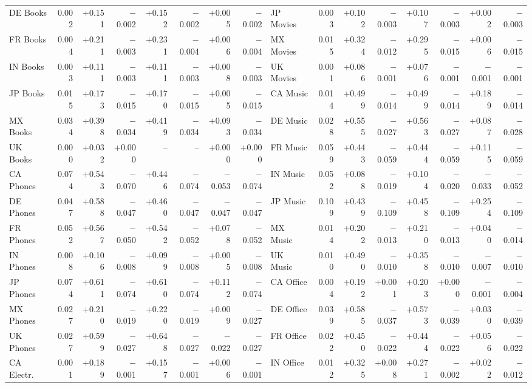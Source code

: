 \begin{table}[H]
\begin{tabular}{lrrrrrrr@{\hspace{10pt}}lrrrrrrr}
DE Books & 0.002 & +0.151 & $-$0.002 & +0.152 & $-$0.002 & +0.005 & $-$0.002 & JP Movies & 0.003 & +0.102 & $-$0.003 & +0.107 & $-$0.003 & +0.002 & $-$0.003 \\
FR Books & 0.004 & +0.211 & $-$0.003 & +0.231 & $-$0.004 & +0.006 & $-$0.004 & MX Movies & 0.015 & +0.324 & $-$0.012 & +0.295 & $-$0.015 & +0.006 & $-$0.015 \\
IN Books & 0.003 & +0.111 & $-$0.003 & +0.111 & $-$0.003 & +0.008 & $-$0.003 & UK Movies & 0.001 & +0.086 & $-$0.001 & +0.076 & $-$0.001 & $-$0.001 & $-$0.001 \\
JP Books & 0.015 & +0.173 & $-$0.015 & +0.170 & $-$0.015 & +0.005 & $-$0.015 & CA Music & 0.014 & +0.499 & $-$0.014 & +0.499 & $-$0.014 & +0.189 & $-$0.014 \\
MX Books & 0.034 & +0.398 & $-$0.034 & +0.419 & $-$0.034 & +0.093 & $-$0.034 & DE Music & 0.028 & +0.555 & $-$0.027 & +0.563 & $-$0.027 & +0.087 & $-$0.028 \\
UK Books & 0.000 & +0.032 & +0.000 & -- & -- & +0.000 & +0.000 & FR Music & 0.059 & +0.443 & $-$0.059 & +0.444 & $-$0.059 & +0.115 & $-$0.059 \\
CA Phones & 0.074 & +0.543 & $-$0.070 & +0.446 & $-$0.074 & $-$0.053 & $-$0.074 & IN Music & 0.052 & +0.088 & $-$0.019 & +0.104 & $-$0.020 & $-$0.033 & $-$0.052 \\
DE Phones & 0.047 & +0.588 & $-$0.047 & +0.460 & $-$0.047 & $-$0.047 & $-$0.047 & JP Music & 0.109 & +0.439 & $-$0.109 & +0.458 & $-$0.109 & +0.254 & $-$0.109 \\
FR Phones & 0.052 & +0.567 & $-$0.050 & +0.542 & $-$0.052 & +0.078 & $-$0.052 & MX Music & 0.014 & +0.202 & $-$0.013 & +0.210 & $-$0.013 & +0.040 & $-$0.014 \\
IN Phones & 0.008 & +0.106 & $-$0.008 & +0.099 & $-$0.008 & +0.005 & $-$0.008 & UK Music & 0.010 & +0.490 & $-$0.010 & +0.358 & $-$0.010 & $-$0.007 & $-$0.010 \\
JP Phones & 0.074 & +0.611 & $-$0.074 & +0.610 & $-$0.074 & +0.112 & $-$0.074 & CA Office & 0.004 & +0.192 & +0.001 & +0.203 & +0.000 & $-$0.001 & $-$0.004 \\
MX Phones & 0.027 & +0.210 & $-$0.019 & +0.220 & $-$0.019 & +0.009 & $-$0.027 & DE Office & 0.039 & +0.585 & $-$0.037 & +0.573 & $-$0.039 & +0.030 & $-$0.039 \\
UK Phones & 0.027 & +0.599 & $-$0.027 & +0.648 & $-$0.027 & $-$0.022 & $-$0.027 & FR Office & 0.022 & +0.450 & $-$0.022 & +0.444 & $-$0.022 & +0.056 & $-$0.022 \\
CA Electr. & 0.001 & +0.189 & $-$0.001 & +0.157 & $-$0.001 & +0.006 & $-$0.001 & IN Office & 0.012 & +0.325 & +0.008 & +0.271 & $-$0.002 & +0.022 & $-$0.012 \\

\end{tabular}
\end{table}
